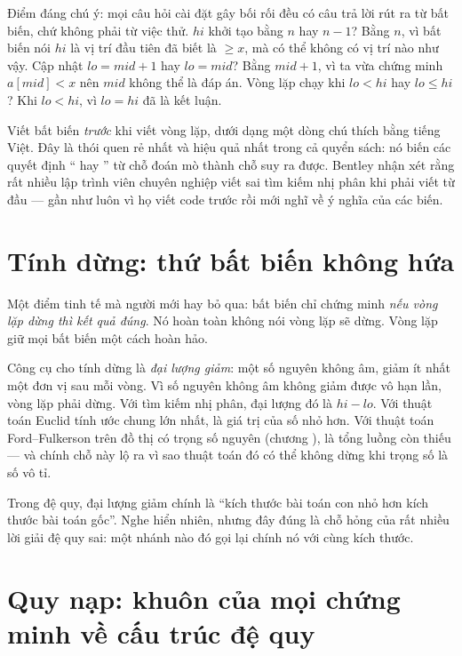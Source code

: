 \documentclass[../../algorithm.tex]{subfiles}
\begin{document}
Điểm đáng chú ý: mọi câu hỏi cài đặt gây bối rối đều có câu trả lời rút ra từ bất biến, chứ không phải từ việc thử. \(hi\) khởi tạo bằng \(n\) hay \(n-1\)? Bằng \(n\), vì bất biến nói \(hi\) là vị trí đầu tiên đã biết là \(\ge x\), mà có thể không có vị trí nào như vậy. Cập nhật \(lo = mid+1\) hay \(lo = mid\)? Bằng \(mid+1\), vì ta vừa chứng minh \(a[mid] < x\) nên \(mid\) không thể là đáp án. Vòng lặp chạy khi \(lo < hi\) hay \(lo \le hi\)? Khi \(lo < hi\), vì \(lo = hi\) đã là kết luận.

\begin{cannho}
Viết bất biến \emph{trước} khi viết vòng lặp, dưới dạng một dòng chú thích bằng tiếng Việt. Đây là thói quen rẻ nhất và hiệu quả nhất trong cả quyển sách: nó biến các quyết định ``\code{<} hay \code{<=}'' từ chỗ đoán mò thành chỗ suy ra được. Bentley\cite{bentley2000} nhận xét rằng rất nhiều lập trình viên chuyên nghiệp viết sai tìm kiếm nhị phân khi phải viết từ đầu --- gần như luôn vì họ viết code trước rồi mới nghĩ về ý nghĩa của các biến.
\end{cannho}

\section{Tính dừng: thứ bất biến không hứa}

Một điểm tinh tế mà người mới hay bỏ qua: bất biến chỉ chứng minh \emph{nếu vòng lặp dừng thì kết quả đúng}. Nó hoàn toàn không nói vòng lặp sẽ dừng. Vòng lặp  giữ mọi bất biến một cách hoàn hảo.

Công cụ cho tính dừng là \emph{đại lượng giảm}: một số nguyên không âm, giảm ít nhất một đơn vị sau mỗi vòng. Vì số nguyên không âm không giảm được vô hạn lần, vòng lặp phải dừng. Với tìm kiếm nhị phân, đại lượng đó là \(hi - lo\). Với thuật toán Euclid tính ước chung lớn nhất, là giá trị của số nhỏ hơn. Với thuật toán Ford--Fulkerson trên đồ thị có trọng số nguyên (chương ), là tổng luồng còn thiếu --- và chính chỗ này lộ ra vì sao thuật toán đó có thể không dừng khi trọng số là số vô tỉ.

Trong đệ quy, đại lượng giảm chính là ``kích thước bài toán con nhỏ hơn kích thước bài toán gốc''. Nghe hiển nhiên, nhưng đây đúng là chỗ hỏng của rất nhiều lời giải đệ quy sai: một nhánh nào đó gọi lại chính nó với cùng kích thước.

\section{Quy nạp: khuôn của mọi chứng minh về cấu trúc đệ quy}
\end{document}
